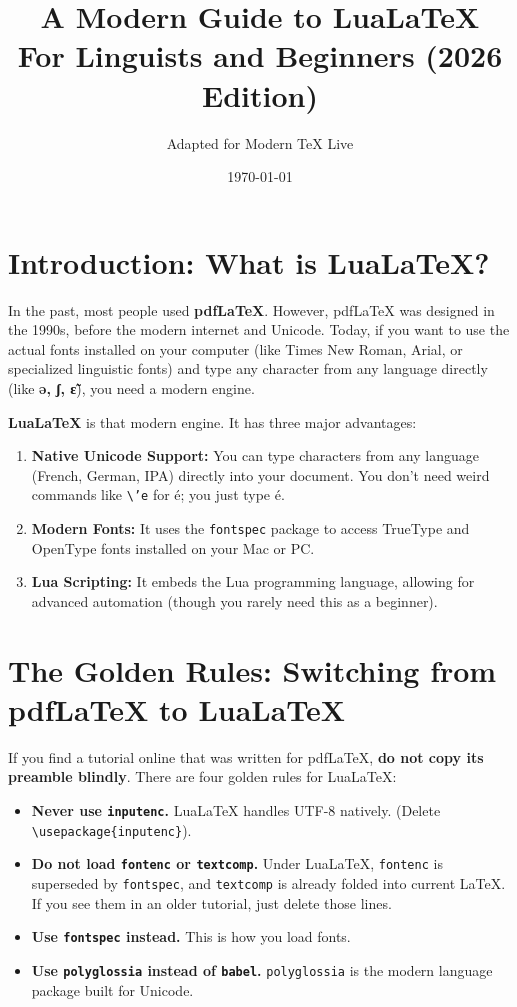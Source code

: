 \documentclass[11pt,a4paper]{article}
\title{A Modern Guide to \textbf{LuaLaTeX} \\ \large For Linguists and Beginners (2026 Edition)}
\author{Adapted for Modern TeX Live}
\date{\today}
\begin{document}
\maketitle
\tableofcontents
\vspace{1em}

\section{Introduction: What is LuaLaTeX?}

In the past, most people used \textbf{pdfLaTeX}. However, pdfLaTeX was designed in the 1990s, before the modern internet and Unicode. Today, if you want to use the actual fonts installed on your computer (like Times New Roman, Arial, or specialized linguistic fonts) and type any character from any language directly (like \textbf{ə, ʃ, ɛ̃}), you need a modern engine.

\textbf{LuaLaTeX} is that modern engine. It has three major advantages:
\begin{enumerate}
    \item \textbf{Native Unicode Support:} You can type characters from any language (French, German, IPA) directly into your document. You don't need weird commands like \texttt{\textbackslash'e} for é; you just type é.
    \item \textbf{Modern Fonts:} It uses the \texttt{fontspec} package to access TrueType and OpenType fonts installed on your Mac or PC.
    \item \textbf{Lua Scripting:} It embeds the Lua programming language, allowing for advanced automation (though you rarely need this as a beginner).
\end{enumerate}

\section{The Golden Rules: Switching from pdfLaTeX to LuaLaTeX}

If you find a tutorial online that was written for pdfLaTeX, \textbf{do not copy its preamble blindly}. There are four golden rules for LuaLaTeX:

\begin{itemize}
    \item \textbf{Never use \texttt{inputenc}.} LuaLaTeX handles UTF-8 natively. (Delete \texttt{\textbackslash usepackage\{inputenc\}}).
    \item \textbf{Do not load \texttt{fontenc} or \texttt{textcomp}.} Under LuaLaTeX, \texttt{fontenc} is superseded by \texttt{fontspec}, and \texttt{textcomp} is already folded into current LaTeX. If you see them in an older tutorial, just delete those lines.
    \item \textbf{Use \texttt{fontspec} instead.} This is how you load fonts.
    \item \textbf{Use \texttt{polyglossia} instead of \texttt{babel}.} \texttt{polyglossia} is the modern language package built for Unicode.
\end{itemize}
\end{document}
